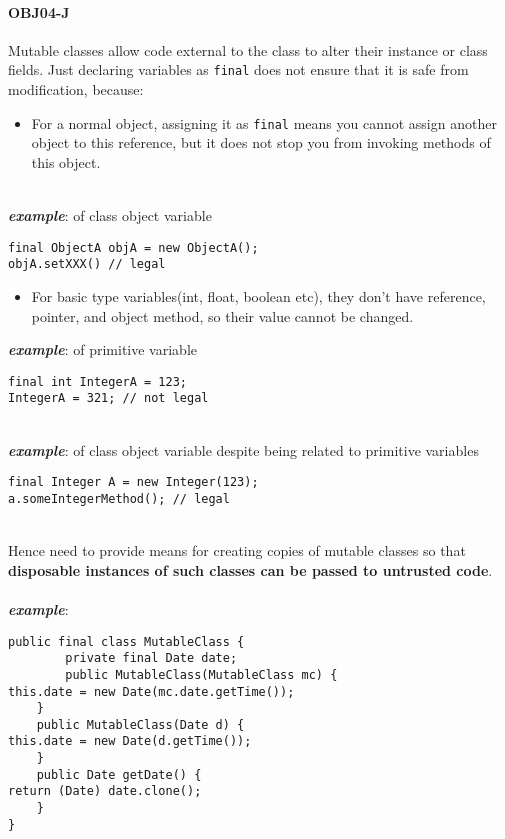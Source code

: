 \documentclass[a4paper]{article}
\begin{document}
\paragraph{OBJ04-J}
Mutable classes allow code external to the class to alter their instance or class fields. Just declaring variables as \texttt{final} does not ensure that it is safe from modification, because:
\begin{itemize}
	\item For a normal object, assigning it as \texttt{final} means you cannot assign another object to this reference, but it does not stop you from invoking methods of this object.
\end{itemize}
\mbox{}\\
\textbf{\textit{example}}: of class object variable
\begin{verbatim}
final ObjectA objA = new ObjectA();
objA.setXXX() // legal
\end{verbatim}
\begin{itemize}
	\item For basic type variables(int, float, boolean etc), they don't have reference, pointer, and object method, so their value cannot be changed.
\end{itemize}
\newpage
\noindent \textbf{\textit{example}}: of primitive variable
\begin{verbatim}
final int IntegerA = 123;
IntegerA = 321; // not legal
\end{verbatim}
\mbox{}\\
\textbf{\textit{example}}: of class object variable despite being related to primitive variables
\begin{verbatim}
final Integer A = new Integer(123);
a.someIntegerMethod(); // legal
\end{verbatim}
\mbox{}\\
Hence need to provide means for creating copies of mutable classes so that \textbf{disposable instances of such classes can be passed to untrusted code}.\\
\\
\textbf{\textit{example}}: 
\begin{verbatim}
public final class MutableClass {
		private final Date date;
		public MutableClass(MutableClass mc) {
this.date = new Date(mc.date.getTime());
	}
	public MutableClass(Date d) {
this.date = new Date(d.getTime()); 
	}
	public Date getDate() {
return (Date) date.clone(); 
	}
}
\end{verbatim}
\end{document}
